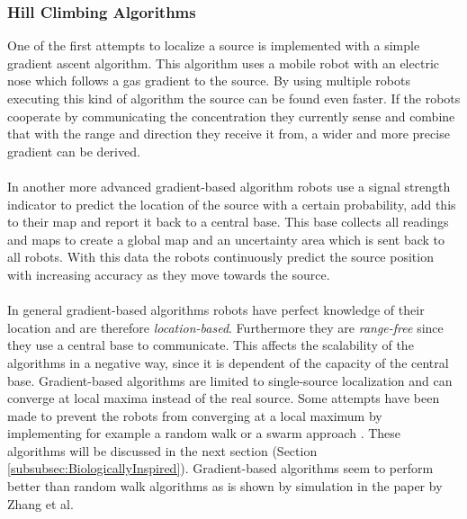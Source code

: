 	\subsubsection{Hill Climbing Algorithms}
		One of the first attempts to localize a source is implemented with a simple gradient ascent algorithm. This algorithm uses a mobile robot with an electric nose which follows a gas gradient to the source. \cite{rozas1991artificial}
		By using multiple robots executing this kind of algorithm the source can be found even faster.
		If the robots cooperate by communicating the concentration they currently sense and combine that with the range and direction they receive it from, a wider and more precise gradient can be derived. \cite{sandini1993gradient}\\
		\\
		In another more advanced gradient-based algorithm robots use a signal strength indicator to predict the location of the source with a certain probability, add this to their map and report it back to a central base.
		This base collects all readings and maps to create a global map and an uncertainty area which is sent back to all robots.
		With this data the robots continuously predict the source position with increasing accuracy as they move towards the source. \cite{zhang2009gradient}\\
		\\
		In general gradient-based algorithms robots have perfect knowledge of their location and are therefore \emph{location-based}.
		Furthermore they are \emph{range-free} since they use a central base to communicate.
		This affects the scalability of the algorithms in a negative way, since it is dependent of the capacity of the central base.
		Gradient-based algorithms are limited to single-source localization and can converge at local maxima instead of the real source.
		Some attempts have been made to prevent the robots from converging at a local maximum by implementing for example a random walk \cite{dhariwal2004bacterium} or a swarm approach \cite{cui2004swarm}. These algorithms will be discussed in the next section (Section \ref{subsubsec:BiologicallyInspired}).
		Gradient-based algorithms seem to perform better than random walk algorithms as is shown by simulation in the paper by Zhang et al. \cite{zhang2009gradient}

